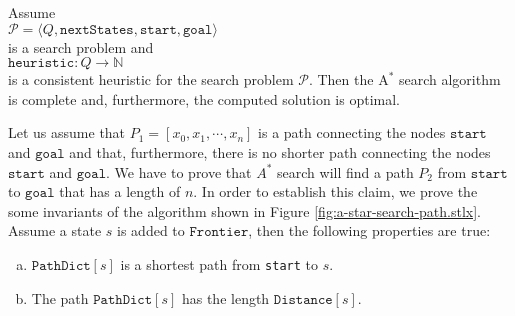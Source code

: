 \begin{Theorem} 
Assume 
\\[0.2cm]
\hspace*{1.3cm}
$\mathcal{P} = \langle Q,\mathtt{nextStates}, \mathtt{start}, \mathtt{goal}\rangle$
\\[0.2cm]
is a search problem and
\\[0.2cm]
\hspace*{1.3cm}
 $\texttt{heuristic}: Q \rightarrow \mathbb{N}$
\\[0.2cm]
is a consistent heuristic for the search problem $\mathcal{P}$.   Then the
$\mathrm{A}^*$ search algorithm is complete and, furthermore, the computed solution is optimal.    
\end{Theorem}

\proof
Let us assume that $P_1 = [x_0,x_1, \cdots, x_n]$ is a path connecting the nodes $\texttt{start}$ and
$\texttt{goal}$ and that, furthermore, there is no shorter path connecting the nodes $\texttt{start}$ and  
$\texttt{goal}$.  We have to prove that $A^*$ search will find a path $P_2$ from  $\texttt{start}$ to
$\texttt{goal}$ that has a length of $n$.  In order to establish this claim, we prove the some invariants
of the algorithm shown in Figure \ref{fig:a-star-search-path.stlx}.  Assume 
a state $s$ is added to $\texttt{Frontier}$, then the following properties are true:
\begin{enumerate}[(a)]
\item $\texttt{PathDict}[s]$ is a shortest path from \texttt{start} to $s$.
\item The path $\texttt{PathDict}[s]$ has the length $\texttt{Distance}[s]$.
\end{enumerate}


